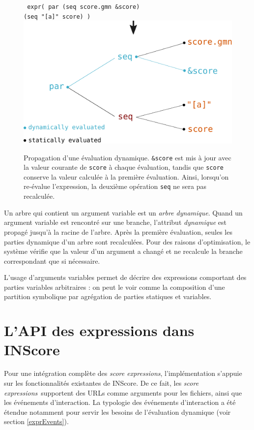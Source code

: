 \documentclass{article}
\newcommand{\OSC}[1]	{{\fontsize{10pt}{10pt} \selectfont\texttt{#1}}}
\newcommand{\oper}[1]	{\textcolor{figRed}{#1}}
\newcommand{\param}[1]	{\textcolor{figOrange}{#1}}
\newcommand{\prefix}[1]	{\textcolor{figBlue}{#1}}
\newcommand{\sExprs}{\emph{score expressions}}
\newcommand{\tab}{\hspace*{4mm}}
\begin{document}
\begin{figure}[th]
\centering
\OSC{ expr( \oper{par} (\oper{seq} \param{score.gmn} \prefix{\&}\param{score}) \\
 \tab\tab\tab\tab (\oper{seq} \param{"[a]" score}) )}
\includegraphics[width=0.9\columnwidth]{imgs/dynamicEval}
\caption{Propagation d'une évaluation dynamique. \OSC{\prefix{\&}\param{score}} est mis à jour avec la valeur courante de \OSC{score} à chaque évaluation, tandis que \OSC{\param{score}} conserve la valeur calculée à la première évaluation. Ainsi, lorsqu'on re-évalue l'expression, la deuxième opération \OSC{\oper{seq}} ne sera pas recalculée. 
}
\label{fig:dynamicEval}
\end{figure}

Un arbre qui contient un argument variable est un \emph{arbre dynamique}. Quand un argument variable est rencontré sur une branche, l'attribut \emph{dynamique} est propagé jusqu'à la racine de l'arbre. Après la première évaluation, seules les parties dynamique d'un arbre sont recalculées. Pour des raisons d'optimisation, le système vérifie que la valeur d'un argument a changé et ne recalcule la branche correspondant que si nécessaire.

L'usage d'arguments variables permet de décrire des expressions comportant des parties variables arbitraires : on peut le voir comme la composition d'une partition symbolique par agrégation de parties statiques et variables.

\section{L'API des expressions dans INScore}
\label{exprAPI}

Pour une intégration complète des \sExprs, l'implémentation s'appuie sur les fonctionnalités existantes de INScore. De ce fait, les \sExprs\ supportent des URLs comme arguments pour les fichiers, ainsi que les événements d'interaction. La typologie des événements d'interaction a été étendue notamment pour servir les besoins de l'évaluation dynamique (voir section \ref{exprEvents}).
\end{document}
